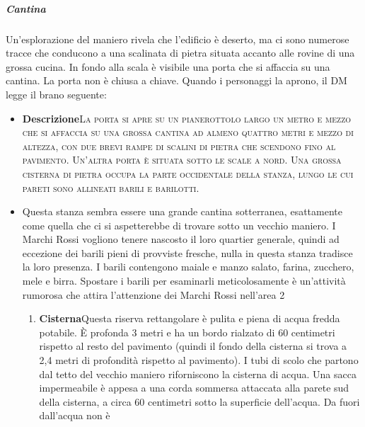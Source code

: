 \documentclass{article}
\begin{document}
    \subparagraph{Cantina} Un’esplorazione del maniero rivela che l’edificio è deserto,
    ma ci sono numerose tracce che conducono a una scalinata
    di pietra situata accanto alle rovine di una grossa cucina. In
    fondo alla scala è visibile una porta che si affaccia su una
    cantina. La porta non è chiusa a chiave.
    Quando i personaggi la aprono, il DM legge il brano seguente:
        \begin{itemize}
                    \item \textbf{Descrizione}\textsc{La porta si apre su un pianerottolo largo un metro e mezzo che si
                affaccia su una grossa cantina ad almeno quattro metri e mezzo
                di altezza, con due brevi rampe di scalini di pietra che scendono
                fino al pavimento. Un'altra porta è situata sotto le scale a nord.
                Una grossa cisterna di pietra occupa la parte occidentale della
                stanza, lungo le cui pareti sono allineati barili e barilotti.}
                            \item Questa stanza sembra essere una grande cantina
                sotterranea, esattamente come quella che ci si aspetterebbe
                di trovare sotto un vecchio maniero. I Marchi Rossi vogliono
                tenere nascosto il loro quartier generale, quindi ad eccezione
                dei barili pieni di provviste fresche, nulla in questa stanza
                tradisce la loro presenza.
                I barili contengono maiale e manzo salato, farina,
                zucchero, mele e birra. Spostare i barili per esaminarli
                meticolosamente è un'attività rumorosa che attira l’attenzione
                dei Marchi Rossi nell’area 2
                        \begin{enumerate}
                            \item \textbf{Cisterna}Questa riserva rettangolare è pulita e piena di
                        acqua fredda potabile. È profonda 3 metri e ha un bordo
                        rialzato di 60 centimetri rispetto al resto del pavimento
                        (quindi il fondo della cisterna si trova a 2,4 metri di profondità
                        rispetto al pavimento). I tubi di scolo che partono dal tetto del
                        vecchio maniero riforniscono la cisterna di acqua.
                        Una sacca impermeabile è appesa a una corda sommersa
                        attaccata alla parete sud della cisterna, a circa 60 centimetri
                        sotto la superficie dell’acqua. Da fuori dall'acqua non è

\end{enumerate}
\end{itemize}
\end{document}
